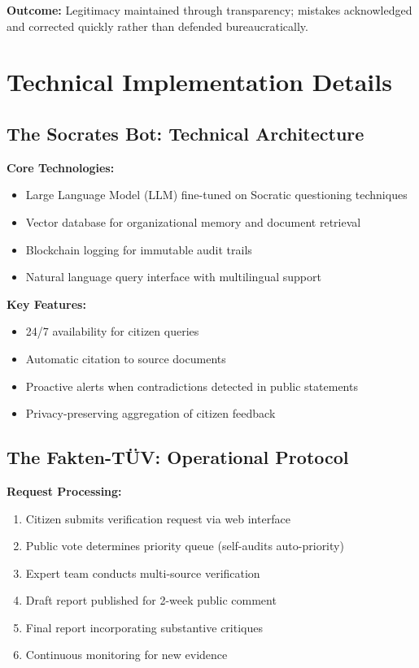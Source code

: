 \documentclass[11pt,a4paper]{article}
\begin{document}
\textbf{Outcome:} Legitimacy maintained through transparency; mistakes acknowledged and corrected quickly rather than defended bureaucratically.

\section{Technical Implementation Details}
\label{app:technical}

\subsection*{The Socrates Bot: Technical Architecture}

\textbf{Core Technologies:}
\begin{itemize}[nosep]
    \item Large Language Model (LLM) fine-tuned on Socratic questioning techniques
    \item Vector database for organizational memory and document retrieval
    \item Blockchain logging for immutable audit trails
    \item Natural language query interface with multilingual support
\end{itemize}

\textbf{Key Features:}
\begin{itemize}[nosep]
    \item 24/7 availability for citizen queries
    \item Automatic citation to source documents
    \item Proactive alerts when contradictions detected in public statements
    \item Privacy-preserving aggregation of citizen feedback
\end{itemize}

\subsection*{The Fakten-TÜV: Operational Protocol}

\textbf{Request Processing:}
\begin{enumerate}[nosep]
    \item Citizen submits verification request via web interface
    \item Public vote determines priority queue (self-audits auto-priority)
    \item Expert team conducts multi-source verification
    \item Draft report published for 2-week public comment
    \item Final report incorporating substantive critiques
    \item Continuous monitoring for new evidence
\end{enumerate}
\end{document}
